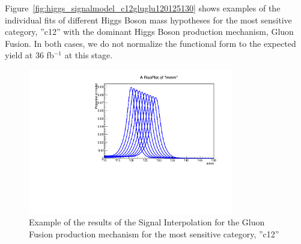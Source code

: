 Figure~\ref{fig:higgs_signalmodel_c12gluglu120125130} shows examples of the individual fits of different Higgs Boson mass hypotheses for the most sensitive category,  ''c12'' with the dominant Higgs Boson production mechanism, Gluon Fusion. In both cases, we do not normalize the functional form to the expected yield at 36 fb$^{-1}$ at this stage.
 \begin{figure}[H]
     \centering
     \includegraphics[width=0.8\textwidth]{figures/signal_model/AppendixBdt/interpolation_GluGlu_cat12.pdf}
     \caption{Example of the results of the Signal Interpolation for the Gluon Fusion production mechanism for the most sensitive category, ''c12''}
     \label{fig:higgs_signalmodel_c12glugluinterp}
 \end{figure}
